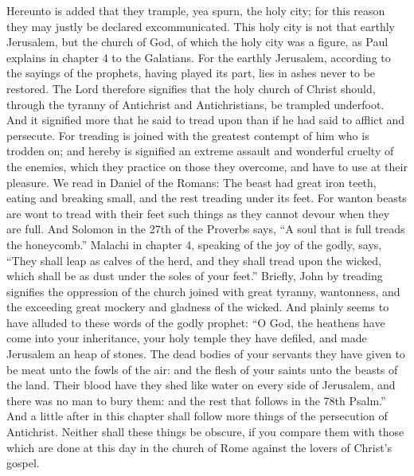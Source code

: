 Hereunto is added that they trample, yea spurn, the holy city; for this reason they may justly be declared excommunicated. This holy city is not that earthly Jerusalem, but the church of God, of which the holy city was a figure, as Paul explains in chapter 4 to the Galatians. For the earthly Jerusalem, according to the sayings of the prophets, having played its part, lies in ashes never to be restored. The Lord therefore signifies that the holy church of Christ should, through the tyranny of Antichrist and Antichristians, be trampled underfoot. And it signified more that he said to tread upon than if he had said to afflict and persecute. For treading is joined with the greatest contempt of him who is trodden on; and hereby is signified an extreme assault and wonderful cruelty of the enemies, which they practice on those they overcome, and have to use at their pleasure. We read in Daniel of the Romans: The beast had great iron teeth, eating and breaking small, and the rest treading under its feet. For wanton beasts are wont to tread with their feet such things as they cannot devour when they are full. And Solomon in the 27th of the Proverbs says, “A soul that is full treads the honeycomb.” Malachi in chapter 4, speaking of the joy of the godly, says, “They shall leap as calves of the herd, and they shall tread upon the wicked, which shall be as dust under the soles of your feet.” Briefly, John by treading signifies the oppression of the church joined with great tyranny, wantonness, and the exceeding great mockery and gladness of the wicked. And plainly seems to have alluded to these words of the godly prophet: “O God, the heathens have come into your inheritance, your holy temple they have defiled, and made Jerusalem an heap of stones. The dead bodies of your servants they have given to be meat unto the fowls of the air: and the flesh of your saints unto the beasts of the land. Their blood have they shed like water on every side of Jerusalem, and there was no man to bury them: and the rest that follows in the 78th Psalm.” And a little after in this chapter shall follow more things of the persecution of Antichrist. Neither shall these things be obscure, if you compare them with those which are done at this day in the church of Rome against the lovers of Christ’s gospel.

